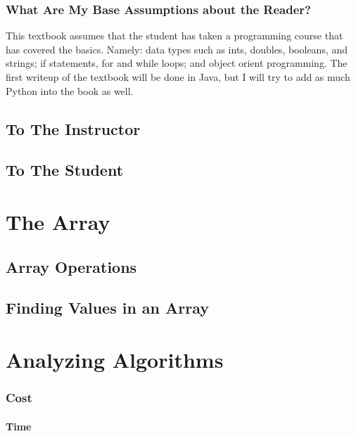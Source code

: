 \documentclass[10pt,a4paper]{book}
\begin{document}
\subsection{What Are My Base Assumptions about the Reader?}

This textbook assumes that the student has taken a programming course that has covered the basics.
Namely: data types such as ints, doubles, booleans, and strings; if statements, for and while loops; and object orient programming.
The first writeup of the textbook will be done in Java, but I will try to add as much Python into the book as well.


\section{To The Instructor}


\section{To The Student}




\chapter{The Array}

\section{Array Operations}

\section{Finding Values in an Array}

\chapter{Analyzing Algorithms}

\subsection{Cost}
\subsubsection{Time}
\end{document}
